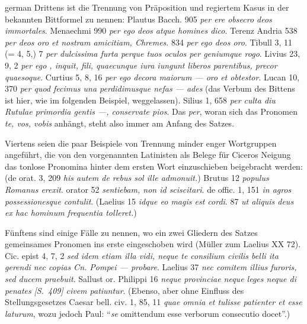 \begin{otherlanguage*}{german}
Drittens ist die Trennung von Präposition und regiertem Kasus in der bekannten Bittformel zu nennen: Plautus Bacch. 905 \emph{per  ere obsecro deos immortales}. Menaechmi 990 \emph{per ego  deos atque homines dico}. Terenz Andria 538 \emph{per  deos oro et nostram amicitiam, Chremes}. 834 \emph{per ego  deos oro}. Tibull 3, 11 (= 4, 5,) 7 \emph{per  dulcissima furta perque tuos oculos per geniumque rogo}. Livius 23, 9, 2 \emph{per ego , inquit, fili, quaecunque iura iungunt liberos parentibus, precor quaesoque}. Curtius 5, 8, 16 \emph{per ego  decora maiorum — oro et obtestor}. Lucan 10, 370 \emph{per  quod fecimus una perdidimusque nefas — ades} (das Verbum des Bittens ist hier, wie im folgenden Beispiel, weggelassen). Silius 1, 658 \emph{per  culta diu Rutulae primordia gentis —, conservate pios}. Das \emph{per}, woran sich das Pronomen \emph{te, vos, vobis} anhängt, steht also immer am Anfang des Satzes.

Viertens seien die paar Beispiele von Trennung minder enger Wortgruppen angeführt, die von den vorgenannten Latinisten als Belege für Ciceros Neigung das tonlose Pronomina hinter dem ersten Wort einzuschieben beigebracht werden: (de orat. 3, 209 \emph{his autem de rebus sol  ille admonuit.}) Brutus 12 \emph{populus  Romanus erexit}. orator 52 \emph{sentiebam, non  id sciscitari}. de offic. 1, 151 \emph{in agros  possessionesque contulit}. (Laelius 15 \emph{idque eo  magis est cordi}. 87 \emph{ut aliquis  deus ex hac hominum frequentia tolleret.})

Fünftens sind einige Fälle zu nennen, wo ein zwei Gliedern des Satzes gemeinsames Pronomen ins erste eingeschoben wird (Müller zum Laelius XX 72). Cic. epist 4, 7, 2 \emph{sed idem etiam illa vidi, neque te consilium civilis belli ita gerendi nec copias Cn. Pompei — probare}. Laelius 37 \emph{nec  comitem illius furoris, sed ducem praebuit}. Sallust or. Philippi 16 \emph{neque  provinciae neque leges neque di penates} \hypertarget{p409}{\emph{[S.~409]}}\label{p409} \emph{civem patiuntur}. (Ebenso, aber ohne Einfluss des Stellungsgesetzes Caesar bell. civ. 1, 85, 11 \emph{quae omnia et  tulisse patienter et esse laturum}, wozu jedoch Paul: “\emph{se} omittendum esse verborum consecutio docet”.)


\end{otherlanguage*}
